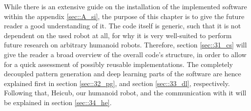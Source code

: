 \label{sec::3_me}
While there is an extensive guide on the installation of the implemented software within the appendix \ref{sec::A_si}, the purpose of this chapter is to give the future reader a good understanding of it. The code itself is generic, such that it is not dependent on the used robot at all, for why it is very well-suited to perform future research on arbitrary humanoid robots. Therefore, section \ref{sec::31_cs} will give the reader a broad overview of the overall code's structure, in order to allow for a quick assessment of possibly reusable implementations. The completely decoupled pattern generation and deep learning parts of the software are hence explained first in section \ref{sec::32_pg}, and section \ref{sec::33_dl}, respectively. Following that, Heicub, our humanoid robot, and the communication with it will be explained in section \ref{sec::34_he}.







